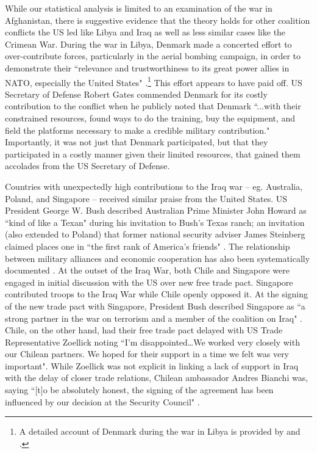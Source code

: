 \documentclass[12pt,letterpaper]{article}
\begin{document}
	While our statistical analysis is limited to an examination of the war in Afghanistan, there is suggestive evidence that the theory holds for other coalition conflicts the US led like Libya and Iraq as well as less similar cases like the Crimean War. During the war in Libya, Denmark made a concerted effort to over-contribute forces, particularly in the aerial bombing campaign, in order to demonstrate their ``relevance and trustworthiness to its great power allies in NATO, especially the United States" \citep[109]{jakobsen_goodnewslibya_2012}.\footnote{A detailed account of Denmark during the war in Libya is provided by \citet{dicke_natoburdensharinglibya_2013} and \citet{jakobsen_prestigeseekingsmallstates_2018}.} This effort appears to have paid off. US Secretary of Defense Robert Gates \citet{gates_securitydefenseagenda_2011} commended Denmark for its costly contribution to the conflict when he publicly noted that Denmark ``...with their constrained resources, found ways to do the training, buy the equipment, and field the platforms necessary to make a credible military contribution." Importantly, it was not just that Denmark participated, but that they participated in a costly manner given their limited resources, that gained them accolades from the US Secretary of Defense.
	
	Countries with unexpectedly high contributions to the Iraq war -- eg. Australia, Poland, and Singapore -- received similar praise from the United States. US President George W. Bush described Australian Prime Minister John Howard as ``kind of like a Texan" during his invitation to Bush's Texas ranch; an invitation (also extended to Poland) that former national security adviser James Steinberg claimed places one in ``the first rank of America's friends" \citep{sanger_meanwhilebackranch_2003}. The relationship between military alliances and economic cooperation has also been systematically documented \citep{long_tradingsecuritymilitary_2006}. At the outset of the Iraq War, both Chile and Singapore were engaged in initial discussion with the US over new free trade pact. Singapore contributed troops to the Iraq War while Chile openly opposed it. At the signing of the new trade pact with Singapore, President Bush described Singapore as ``a strong partner in the war on terrorism and a member of the coalition on Iraq" \citep{armstrong_alliesrewardedtrade_2003}. Chile, on the other hand, had their free trade pact delayed with US Trade Representative Zoellick noting ``I'm disappointed\ldots We worked very closely with our Chilean partners. We hoped for their support in a time we felt was very important". While Zoellick was not explicit in linking a lack of support in Iraq with the delay of closer trade relations, Chilean ambassador Andres Bianchi was, saying ``[t]o be absolutely honest, the signing of the agreement has been influenced by our decision at the Security Council" \citep{armstrong_alliesrewardedtrade_2003}.
\end{document}
